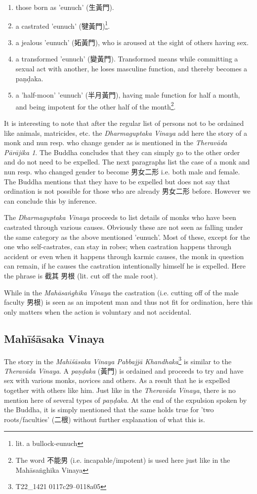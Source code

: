 \begin{enumerate}
\item those born as 'eunuch' (生黃門). 
\item a castrated 'eunuch' (犍黃門)\footnote{lit. a bullock-eunuch}.
\item a jealous 'eunuch' (妬黃門), who is aroused at the sight of others having sex.
\item a transformed 'eunuch' (變黃門). Transformed means while committing a sexual act with another, he loses masculine function, and thereby becomes a paṇḍaka.
\item a 'half-moon' 'eunuch' (半月黃門), having male function for half a month, and being impotent for the other half of the month\footnote{The word 不能男 (i.e. incapable/impotent) is used here just like in the Mahāsaṅghika Vinaya}.
\end{enumerate}

It is interesting to note that after the regular list of persons not to be ordained like animals, matricides, etc. the {\em Dharmaguptaka Vinaya} add here the story of a monk and nun resp. who change gender as is mentioned in the {\em Theravāda Pārājika 1}. The Buddha concludes that they can simply go to the other order and do not need to be expelled. The next paragraphs list the case of a monk and nun resp. who changed gender to become 男女二形 i.e. both male and female. The Buddha mentions that they have to be expelled but does not say that ordination is not possible for those who are already 男女二形 before. However we can conclude this by inference.

The {\em Dharmaguptaka Vinaya} proceeds to list details of monks who have been castrated through various causes. Obviously these are not seen as falling under the same category as the above mentioned 'eunuch'. Most of these, except for the one who self-castrates, can stay in robes; when castration happens through accident or even when it happens through karmic causes, the monk in question can remain, if he causes the castration intentionally himself he is expelled. Here the phrase is 截其 男根 (lit. cut off the male root).

While in the {\em Mahāsaṅghika Vinaya} the castration (i.e. cutting off of the male faculty 男根) is seen as an impotent man and thus not fit for ordination, here this only matters when the action is voluntary and not accidental.


\subsection{Mahīśāsaka Vinaya}
The story in the {\em Mahīśāsaka Vinaya Pabbajjā Khandhaka}\footnote{T22_1421 0117c29–0118a05} is similar to the {\em Theravāda Vinaya}. A {\em paṇḍaka} (黃門) is ordained and proceeds to try and have sex with various monks, novices and others. As a result that he is expelled together with others like him. Just like in the {\em Theravāda Vinaya}, there is no mention here of several types of {\em paṇḍaka}. At the end of the expulsion spoken by the Buddha, it is simply mentioned that the same holds true for 'two roots/faculties' (二根) without further explanation of what this is.

